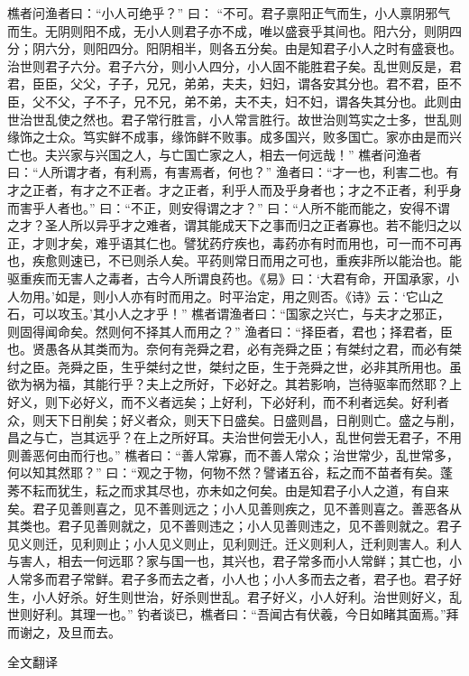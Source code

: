 \documentclass[12pt,UTF8]{ctexbook}
\begin{document}
樵者问渔者曰：“小人可绝乎？”
曰： “不可。君子禀阳正气而生，小人禀阴邪气而生。无阴则阳不成，无小人则君子亦不成，唯以盛衰乎其间也。阳六分，则阴四分；阴六分，则阳四分。阳阴相半，则各五分矣。由是知君子小人之时有盛衰也。治世则君子六分。君子六分，则小人四分，小人固不能胜君子矣。乱世则反是，君君，臣臣，父父，子子，兄兄，弟弟，夫夫，妇妇，谓各安其分也。君不君，臣不臣，父不父，子不子，兄不兄，弟不弟，夫不夫，妇不妇，谓各失其分也。此则由世治世乱使之然也。君子常行胜言，小人常言胜行。故世治则笃实之士多，世乱则缘饰之士众。笃实鲜不成事，缘饰鲜不败事。成多国兴，败多国亡。家亦由是而兴亡也。夫兴家与兴国之人，与亡国亡家之人，相去一何远哉！”
樵者问渔者曰：“人所谓才者，有利焉，有害焉者，何也？”
渔者曰：“才一也，利害二也。有才之正者，有才之不正者。才之正者，利乎人而及乎身者也；才之不正者，利乎身而害乎人者也。”
曰：“不正，则安得谓之才？”
曰：“人所不能而能之，安得不谓之才？圣人所以异乎才之难者，谓其能成天下之事而归之正者寡也。若不能归之以正，才则才矣，难乎语其仁也。譬犹药疗疾也，毒药亦有时而用也，可一而不可再也，疾愈则速已，不已则杀人矣。平药则常日而用之可也，重疾非所以能治也。能驱重疾而无害人之毒者，古今人所谓良药也。《易》曰：‘大君有命，开国承家，小人勿用。’如是，则小人亦有时而用之。时平治定，用之则否。《诗》云：‘它山之石，可以攻玉。’其小人之才乎！”
樵者谓渔者曰：“国家之兴亡，与夫才之邪正，则固得闻命矣。然则何不择其人而用之？”
渔者曰：“择臣者，君也；择君者，臣也。贤愚各从其类而为。奈何有尧舜之君，必有尧舜之臣；有桀纣之君，而必有桀纣之臣。尧舜之臣，生乎桀纣之世，桀纣之臣，生于尧舜之世，必非其所用也。虽欲为祸为福，其能行乎？夫上之所好，下必好之。其若影响，岂待驱率而然耶？上好义，则下必好义，而不义者远矣；上好利，下必好利，而不利者远矣。好利者众，则天下日削矣；好义者众，则天下日盛矣。日盛则昌，日削则亡。盛之与削，昌之与亡，岂其远乎？在上之所好耳。夫治世何尝无小人，乱世何尝无君子，不用则善恶何由而行也。”
樵者曰：“善人常寡，而不善人常众；治世常少，乱世常多，何以知其然耶？”
曰：“观之于物，何物不然？譬诸五谷，耘之而不苗者有矣。蓬莠不耘而犹生，耘之而求其尽也，亦未如之何矣。由是知君子小人之道，有自来矣。君子见善则喜之，见不善则远之；小人见善则疾之，见不善则喜之。善恶各从其类也。君子见善则就之，见不善则违之；小人见善则违之，见不善则就之。君子见义则迁，见利则止；小人见义则止，见利则迁。迁义则利人，迁利则害人。利人与害人，相去一何远耶？家与国一也，其兴也，君子常多而小人常鲜；其亡也，小人常多而君子常鲜。君子多而去之者，小人也；小人多而去之者，君子也。君子好生，小人好杀。好生则世治，好杀则世乱。君子好义，小人好利。治世则好义，乱世则好利。其理一也。”
钓者谈已，樵者曰：“吾闻古有伏羲，今日如睹其面焉。”拜而谢之，及旦而去。


全文翻译
\end{document}
